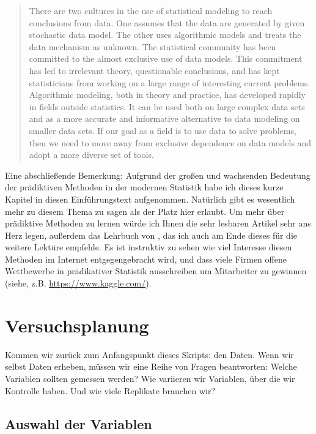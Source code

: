 \documentclass[a4paper,twoside]{tufte-book}\usepackage[]{graphicx}\usepackage[]{color}
\begin{document}
\begin{quote}
There are two cultures in the use of statistical modeling to reach conclusions from data. One assumes that the data are generated by given stochastic data model. The other uses algorithmic models and treats the data mechanism as unknown. The statistical community has been committed to the almost exclusive use of data models. This commitment has led to irrelevant theory, questionable conclusions, and has kept statisticians from working on a large range of interesting current problems. Algorithmic modeling, both in theory and practice, has developed rapidly in fields outside statistics. It can be used both on large complex data sets and as a more accurate and informative alternative to data modeling on smaller data sets. If our goal as a field is to use data to solve problems, then we need to move away from exclusive dependence on data models and adopt a more diverse set of tools.
\end{quote}

Eine abschließende Bemerkung: Aufgrund der großen und wachsenden Bedeutung der prädiktiven Methoden in der modernen Statistik habe ich dieses kurze Kapitel in diesen Einführungstext aufgenommen. Natürlich gibt es wesentlich mehr zu diesem Thema zu sagen als der Platz hier erlaubt. Um mehr über prädiktive Methoden zu lernen würde ich Ihnen die sehr lesbaren Artikel \citet{Breiman-StatisticalModelingTwo-2001, Shmueli-Toexplainor-2010} sehr ans Herz legen, außerdem das Lehrbuch von \citet{James-IntroductiontoStatistical-2013}, das ich auch am Ende dieses für die weitere Lektüre empfehle. Es ist instruktiv zu sehen wie viel Interesse diesen Methoden im Internet entgegengebracht wird, und dass viele Firmen offene Wettbewerbe in prädikativer Statistik ausschreiben um Mitarbeiter zu gewinnen (siehe, z.B. \href{kaggle.com}{https://www.kaggle.com/}). 


\chapter{Versuchsplanung}\label{ch: design of experiments}

Kommen wir zurück zum Anfangspunkt dieses Skripts: den Daten. Wenn wir selbst Daten erheben, müssen wir eine Reihe von Fragen beantworten: Welche Variablen sollten gemessen werden? Wie variieren wir Variablen, über die wir Kontrolle haben. Und wie viele Replikate brauchen wir?


\section{Auswahl der Variablen}
\end{document}
